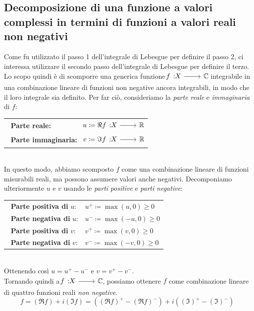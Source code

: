 \subsection{Decomposizione di una funzione a valori complessi in termini di funzioni a valori reali non negativi}
Come fu utilizzato il passo 1 dell'integrale di Lebesgue per definire il passo 2, ci interessa utilizzare il secondo passo dell'integrale di Lebesgue per definire il terzo. Lo scopo quindi è di scomporre una generica funzione $\funz{f}{X}{\complexset}$ integrabile in una combinazione lineare di funzioni non negative ancora integrabili, in modo che il loro integrale sia definito. Per far ciò, consideriamo la \textit{parte reale} e \textit{immaginaria} di $f$:\\
\begin{tabular}{ l l }
	\quad{\scriptsize $\blacksquare $}\ \textbf{Parte reale:} & $\funz{u\coloneqq \Re f}{X}{\realset}$ \\
	\quad{\scriptsize $\blacksquare $}\ \textbf{Parte immaginaria:} & $\funz{v\coloneqq \Im f}{X}{\realset}$  
\end{tabular}\\
In questo modo, abbiamo scomposto $f$ come una combinazione lineare di funzioni misurabili reali, ma possono assumere valori anche negativi. Decomponiamo ulteriormente $u$ e $v$ usando le \textit{parti positive} e \textit{parti negative}:\\
\begin{tabular}{ l l }
	\quad{\scriptsize $\blacksquare $}\ \textbf{Parte positiva di} $u$: & $u^{+}\coloneqq \max\left(u,0\right)\geq 0$ \\
	\quad{\scriptsize $\blacksquare $}\ \textbf{Parte negativa di} $u$: & $u^{-}\coloneqq \max\left(-u,0\right)\geq 0$ \\
	\quad{\scriptsize $\blacksquare $}\ \textbf{Parte positiva di} $v$: & $v^{+}\coloneqq \max\left(v,0\right)\geq 0$ \\
	\quad{\scriptsize $\blacksquare $}\ \textbf{Parte negativa di} $v$: & $v^{-}\coloneqq \max\left(-v,0\right)\geq 0$ \\
\end{tabular}\\
Ottenendo così $u=u^{+}-u^{-}$ e $v=v^{+}-v^{-}$.\\ %
Tornando quindi a $\funz{f}{X}{\complexset}$, possiamo ottenere $f$ come combinazione lineare di quattro funzioni reali \textit{non negative}.
\begin{equation}
	f=\left(\Re f\right)+i\left(\Im f\right)=\left(\left(\Re f\right)^{+}-\left(\Re f\right)^{-}\right)+i\left(\left(\Im\right)^{+}-\left(\Im\right)^{-}\right)
\end{equation}
